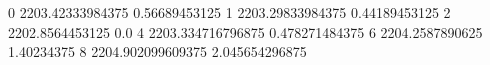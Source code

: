 0 2203.42333984375 0.56689453125
1 2203.29833984375 0.44189453125
2 2202.8564453125 0.0
4 2203.334716796875 0.478271484375
6 2204.2587890625 1.40234375
8 2204.902099609375 2.045654296875
